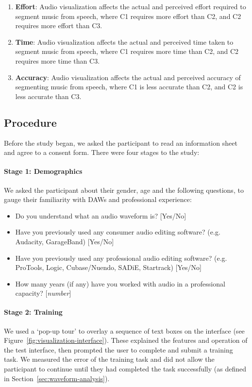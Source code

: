 \newcommand{\subscript}[2]{$#1 _ #2$}
\begin{enumerate}[label=H\arabic*.]
  \item \textbf{Effort}: Audio visualization affects the actual and perceived effort required to segment music from
    speech, where C1 requires more effort than C2, and C2 requires more effort than C3.
  \item \textbf{Time}: Audio visualization affects the actual and perceived time taken to segment music from speech,
    where C1 requires more time than C2, and C2 requires more time than C3.
  \item \textbf{Accuracy}: Audio visualization affects the actual and perceived accuracy of segmenting music from
    speech, where C1 is less accurate than C2, and C2 is less accurate than C3.
\end{enumerate}


\subsection{Procedure}
Before the study began, we asked the participant to read an information sheet and agree to a consent form. There were
four stages to the study:

\paragraph{Stage 1: Demographics}
We asked the participant about their gender, age and the following questions, to gauge their familiarity with DAWs and
professional experience:

{\singlespacing
\begin{itemize}
  \item Do you understand what an audio waveform is? [Yes/No]
  \item Have you previously used any consumer audio editing software? (e.g.  Audacity, GarageBand) [Yes/No]
  \item Have you previously used any professional audio editing software? (e.g.  ProTools, Logic, Cubase/Nuendo, SADiE,
    Startrack) [Yes/No]
  \item How many years (if any) have you worked with audio in a professional capacity? [\textit{number}]
\end{itemize}
}

\paragraph{Stage 2: Training}
We used a `pop-up tour' to overlay a sequence of text boxes on the interface (see
Figure~\ref{fig:visualization-interface}). These explained the features and operation of the test interface, then
prompted the user to complete and submit a training task. We measured the error of the training task and did not allow
the participant to continue until they had completed the task successfully (as defined in
Section~\ref{sec:waveform-analysis}).

